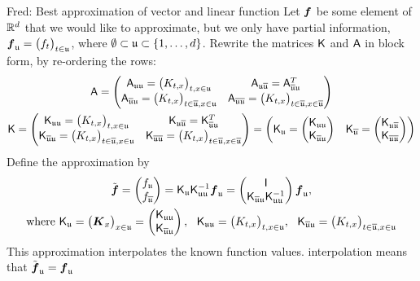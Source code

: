 \documentclass[reqno]{amsart}
\newcommand{\FredNote}[1]{{\color{blue}Fred: #1}}
\begin{document}
\FredNote{Best approximation of vector and linear function }
Let $\boldsymbol{f}$ be some element of $\mathbb{R}^d$ that we would like to approximate, but we only have partial information, $\boldsymbol{f}_{\mathfrak{u}} = \bigl( f_t \bigr)_{t \in \mathfrak{u}}$, where $\emptyset \subset \mathfrak{u} \subset \{1, \ldots, d\}$.  Rewrite the matrices $\mathsf{K}$ and $\mathsf{A}$ in block form, by re-ordering the rows:
\begin{gather*}
\mathsf{A} = \begin{pmatrix}
\mathsf{A}_{\mathfrak{u} \mathfrak{u}} = \bigl(K_{t,x} \bigr)_{t,x \in \mathfrak{u}} & 
\mathsf{A}_{\mathfrak{u} \overline{\mathfrak{u}}} = \mathsf{A}_{\overline{\mathfrak{u}} \mathfrak{u}}^T \\
\mathsf{A}_{\overline{\mathfrak{u}} \mathfrak{u}} = \bigl(K_{t,x} \bigr)_{t \in \overline{\mathfrak{u}},x \in \mathfrak{u}} &
\mathsf{A}_{\overline{\mathfrak{u}} \overline{\mathfrak{u}}} = \bigl(K_{t,x} \bigr)_{t \in \overline{\mathfrak{u}},x \in \overline{\mathfrak{u}}}
\end{pmatrix} \\
\mathsf{K} = \begin{pmatrix}
\mathsf{K}_{\mathfrak{u} \mathfrak{u}} = \bigl(K_{t,x} \bigr)_{t,x \in \mathfrak{u}} & 
\mathsf{K}_{\mathfrak{u} \overline{\mathfrak{u}}} = \mathsf{K}_{\overline{\mathfrak{u}} \mathfrak{u}}^T \\
\mathsf{K}_{\overline{\mathfrak{u}} \mathfrak{u}} = \bigl(K_{t,x} \bigr)_{t \in \overline{\mathfrak{u}},x \in \mathfrak{u}} &
\mathsf{K}_{\overline{\mathfrak{u}} \overline{\mathfrak{u}}} = \bigl(K_{t,x} \bigr)_{t \in \overline{\mathfrak{u}},x \in \overline{\mathfrak{u}}}
\end{pmatrix} = 
\begin{pmatrix} \mathsf{K}_{\mathfrak{u}} = \begin{pmatrix}
\mathsf{K}_{\mathfrak{u} \mathfrak{u}} \\ \mathsf{K}_{\overline{\mathfrak{u}} \mathfrak{u}} 
\end{pmatrix} & \mathsf{K}_{\overline{\mathfrak{u}}} = \begin{pmatrix}
\mathsf{K}_{\mathfrak{u} \overline{\mathfrak{u}}} \\ \mathsf{K}_{\overline{\mathfrak{u}} \overline{\mathfrak{u}}}
\end{pmatrix} \end{pmatrix}
\end{gather*}
Define the approximation by
\begin{gather*}
    \tvf = \begin{pmatrix} f_\fu \\ f_{\overline{\fu}} \end{pmatrix}
    = \mK_\fu \mK^{-1}_{\fu\fu} \vf_\fu 
    = 
    \begin{pmatrix} \mI \\ \mK_{\overline{\fu} \fu } \mK_{\fu\fu}^{-1} \end{pmatrix} 
    \vf_\fu , \\
    \text{where } 
    \mK_\fu = \bigl(\vK_x\bigr)_{x \in \fu} 
    = \begin{pmatrix} \mK_{\fu \fu} \\ \mK_{\overline{\fu} \fu} \end{pmatrix} , 
    \ \ \mK_{\fu\fu} = \bigl(K_{t,x} \bigr)_{t,x \in \fu}, \ \ 
    \mK_{\overline{\fu} \fu} = \bigl(K_{t,x} \bigr)_{t \in \overline{\fu},x \in \fu}
\end{gather*}
This approximation interpolates the known function values.  interpolation means that $\tilde{\boldsymbol{f}}_{\mathfrak{u}} = \boldsymbol{f}_{\mathfrak{u}}$
\end{document}
